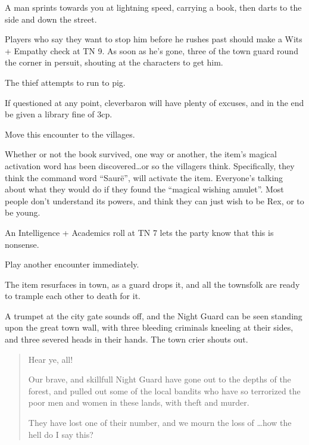 \begin{multicols}{2}
\begin{boxtext}
	A man sprints towards you at lightning speed, carrying a book, then darts to the side and down the street.

\end{boxtext}

Players who say they want to stop him before he rushes past should make a Wits + Empathy check at TN 9.  As soon as he's gone, three of the town guard round the corner in persuit, shouting at the characters to get him.

The thief attempts to run to \gls{pig}.

If questioned at any point, \gls{cleverbaron} will have plenty of excuses, and in the end be given a library fine of 3cp.

Move this encounter to the villages.


Whether or not the book survived, one way or another, the item's magical activation word has been discovered\ldots or so the villagers think.
Specifically, they think the command word ``Saur\"{e}'', will activate the item.
Everyone's talking about what they would do if they found the ``magical wishing amulet''.
Most people don't understand its powers, and think they can just wish to be Rex, or to be young.

An Intelligence + Academics roll at TN 7 lets the party know that this is nonsense.

Play another encounter immediately.


The item resurfaces in town, as a guard drops it, and all the townsfolk are ready to trample each other to death for it.

\begin{boxtext}

	A trumpet at the city gate sounds off, and the Night Guard can be seen standing upon the great town wall, with three bleeding criminals kneeling at their sides, and three severed heads in their hands.  The town crier shouts out.

	\begin{quotation}
		Hear ye, all!

		Our brave, and skillfull Night Guard have gone out to the depths of the forest, and pulled out some of the local bandits who have so terrorized the poor men and women in these lands, with theft and murder.

		They have lost one of their number, and we mourn the loss of \ldots how the hell do I say this?


\end{quotation}
\end{boxtext}
\end{multicols}
